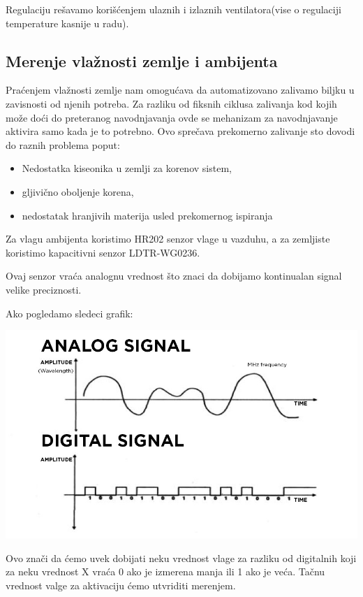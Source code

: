 \documentclass[a4paper,11pt]{book}
\begin{document}
Regulaciju rešavamo korišćenjem ulaznih i izlaznih ventilatora(vise o regulaciji temperature kasnije u radu).

\subsection{Merenje vlažnosti zemlje i ambijenta}
Praćenjem vlažnosti zemlje nam omogućava da automatizovano zalivamo biljku u zavisnosti od njenih potreba. Za razliku od fiksnih ciklusa zalivanja kod kojih može doći do preteranog navodnjavanja ovde se mehanizam za navodnjavanje aktivira samo kada je to potrebno. Ovo sprečava prekomerno zalivanje sto dovodi do raznih problema poput:

\begin{itemize}
  \item Nedostatka kiseonika u zemlji za korenov sistem,
  \item gljivično oboljenje korena,
  \item nedostatak hranjivih materija usled prekomernog ispiranja
\end{itemize}

Za vlagu ambijenta koristimo HR202 senzor vlage u vazduhu, a za zemljiste koristimo kapacitivni senzor LDTR-WG0236.

Ovaj senzor vraća analognu vrednost što znaci da dobijamo kontinualan signal velike preciznosti. 

Ako pogledamo sledeci grafik:

\includegraphics[width=\textwidth]{digital-analog.jpg}

Ovo znači da ćemo uvek dobijati neku vrednost vlage za razliku od digitalnih koji za neku vrednost X vraća 0 ako je izmerena manja ili 1 ako je veća. Tačnu vrednost valge za aktivaciju ćemo utvriditi merenjem.
\end{document}
